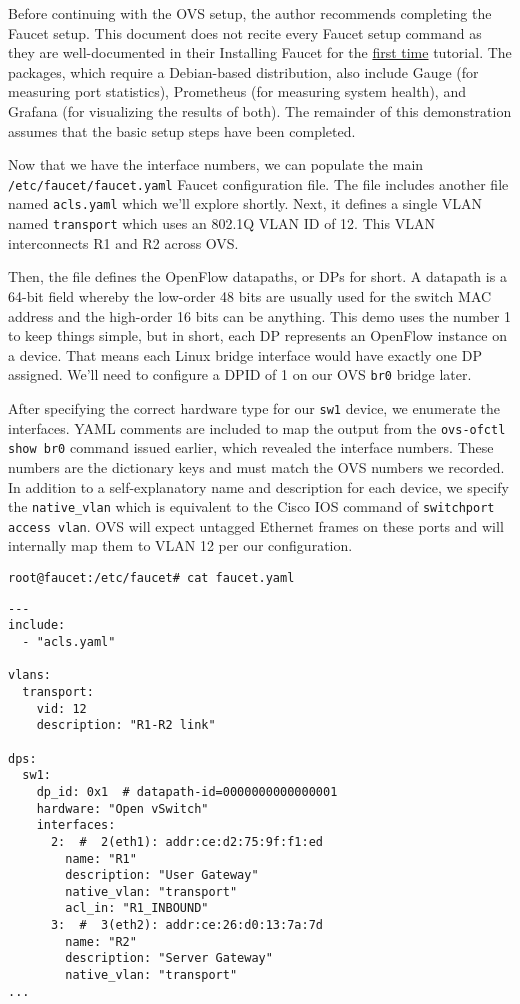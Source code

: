 Before continuing with the OVS setup, the author recommends completing
the Faucet setup. This document does not recite every Faucet setup command
as they are well-documented in their Installing Faucet for the
\href{https://docs.faucet.nz/en/latest/tutorials/first_time.html}{first time}
tutorial. The packages, which require a Debian-based distribution, also
include Gauge (for measuring port statistics), Prometheus (for measuring
system health), and Grafana (for visualizing the results of both). The
remainder of this demonstration assumes that the basic setup steps
have been completed.

Now that we have the interface numbers, we can populate the main
\verb|/etc/faucet/faucet.yaml| Faucet configuration file. The file
includes another file named \verb|acls.yaml| which we'll explore shortly.
Next, it defines a single VLAN named \verb|transport| which uses an 802.1Q
VLAN ID of 12. This VLAN interconnects R1 and R2 across OVS\@.

Then, the file defines the OpenFlow datapaths, or DPs for short. A datapath
is a 64-bit field whereby the low-order 48 bits are usually used for the switch
MAC address and the high-order 16 bits can be anything. This demo uses the
number 1 to keep things simple, but in short, each DP represents an OpenFlow
instance on a device. That means each Linux bridge interface would have
exactly one DP assigned. We'll need to configure a DPID of 1 on our OVS
\verb|br0| bridge later.

After specifying the correct hardware type for our \verb|sw1| device, we
enumerate the interfaces. YAML comments are included to map the output
from the \verb|ovs-ofctl show br0| command issued earlier, which revealed
the interface numbers. These numbers are the dictionary keys 
and must match the OVS numbers we recorded. In addition to a
self-explanatory name and description for each device, we specify the
\verb|native_vlan| which is equivalent to the Cisco IOS command of
\verb|switchport access vlan|. OVS will expect untagged Ethernet frames
on these ports and will internally map them to VLAN 12 per our configuration.

\begin{verbatim}
root@faucet:/etc/faucet# cat faucet.yaml
\end{verbatim}

\begin{verbatim}
---
include:
  - "acls.yaml"

vlans:
  transport:
    vid: 12
    description: "R1-R2 link"

dps:
  sw1:
    dp_id: 0x1  # datapath-id=0000000000000001
    hardware: "Open vSwitch"
    interfaces:
      2:  #  2(eth1): addr:ce:d2:75:9f:f1:ed
        name: "R1"
        description: "User Gateway"
        native_vlan: "transport"
        acl_in: "R1_INBOUND"
      3:  #  3(eth2): addr:ce:26:d0:13:7a:7d
        name: "R2"
        description: "Server Gateway"
        native_vlan: "transport"
...
\end{verbatim}

